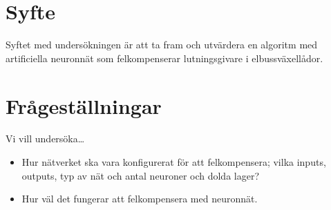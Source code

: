 \section{Syfte}
Syftet med undersökningen är att ta fram och utvärdera en algoritm med
artificiella neuronnät som felkompenserar lutningsgivare i elbussväxellådor.


\section{Frågeställningar}
Vi vill undersöka\ldots
\begin{itemize}
	\item Hur nätverket ska vara konfigurerat för att felkompensera; vilka inputs,
		outputs, typ av nät och antal neuroner och dolda lager?
	\item Hur väl det fungerar att felkompensera med neuronnät.
\end{itemize}
